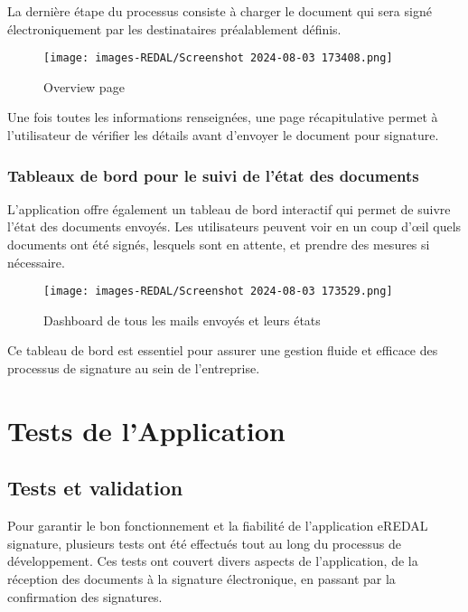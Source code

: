 La dernière étape du processus consiste à charger le document qui sera signé électroniquement par les destinataires préalablement définis.

\begin{figure}[H]
\begin{center}
\texttt{[image: images-REDAL/Screenshot 2024-08-03 173408.png]}
\end{center}
\caption{Overview page}
\end{figure}

Une fois toutes les informations renseignées, une page récapitulative permet à l'utilisateur de vérifier les détails avant d'envoyer le document pour signature.

\subsubsection{Tableaux de bord pour le suivi de l'état des documents}

L'application offre également un tableau de bord interactif qui permet de suivre l'état des documents envoyés. Les utilisateurs peuvent voir en un coup d'œil quels documents ont été signés, lesquels sont en attente, et prendre des mesures si nécessaire.

\begin{figure}[H]
\begin{center}
\texttt{[image: images-REDAL/Screenshot 2024-08-03 173529.png]}
\end{center}
\caption{Dashboard de tous les mails envoyés et leurs états}
\end{figure}

Ce tableau de bord est essentiel pour assurer une gestion fluide et efficace des processus de signature au sein de l'entreprise.





\section{Tests de l'Application}

\subsection{Tests et validation}

Pour garantir le bon fonctionnement et la fiabilité de l'application eREDAL signature, plusieurs tests ont été effectués tout au long du processus de développement. Ces tests ont couvert divers aspects de l'application, de la réception des documents à la signature électronique, en passant par la confirmation des signatures.

